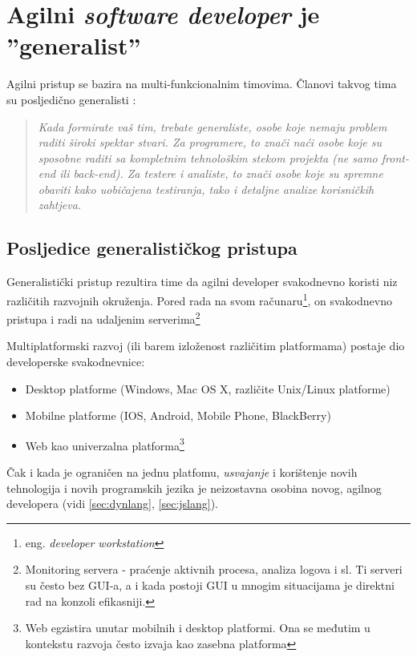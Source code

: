 \documentclass[times, utf8, seminar]{fit}
\begin{document}
\section{Agilni \emph{software developer} je ''generalist''}

Agilni pristup se bazira na multi-funkcionalnim timovima. Članovi takvog tima su posljedično generalisti \citep[str. 19]{agilesamurai}:

\begin{quote}
\emph{Kada formirate vaš tim, trebate generaliste, osobe koje nemaju problem raditi široki spektar stvari. Za programere, to znači naći osobe koje su sposobne raditi sa kompletnim tehnološkim stekom projekta (ne samo front-end ili back-end). Za testere i analiste, to znači osobe koje su spremne obaviti kako uobičajena testiranja, tako i detaljne analize korisničkih zahtjeva.}
\end{quote}

\subsection{Posljedice generalističkog pristupa}

Generalistički pristup rezultira time da agilni developer svakodnevno koristi niz različitih razvojnih okruženja. Pored rada na svom računaru\footnote{eng. \emph{developer workstation}}, on svakodnevno pristupa i radi na udaljenim serverima\footnote{Monitoring servera - praćenje aktivnih procesa, analiza logova i sl. Ti serveri su često bez GUI-a, a i kada postoji GUI u mnogim situacijama je direktni rad na konzoli efikasniji.}

Multiplatformski razvoj (ili barem izloženost različitim platformama) postaje dio developerske svakodnevnice:
\begin{itemize}
    \item Desktop platforme (Windows, Mac OS X, različite Unix/Linux platforme) 
    \item Mobilne platforme (IOS, Android, Mobile Phone, BlackBerry)
    \item Web kao univerzalna platforma\footnote{Web egzistira unutar mobilnih i desktop platformi. Ona se međutim u kontekstu razvoja često izvaja kao zasebna platforma}
\end{itemize}

Čak i kada je ograničen na jednu platfomu, \emph{usvajanje} i korištenje novih tehnologija i novih programskih jezika je neizostavna osobina novog, agilnog developera (vidi \ref{sec:dynlang}, \ref{sec:jslang}).
\end{document}

